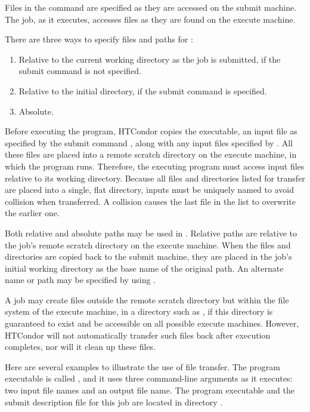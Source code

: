 Files in the  command
are specified as they are accessed on the submit machine.
The job, as it executes, accesses files as they are
found on the execute machine.

There are three ways to specify files and paths
for :
\begin{enumerate}
\item Relative to the current working directory as the job is submitted,
if the submit command  is not specified.
\item Relative to the initial directory, if the submit command 
 is specified.
\item Absolute.
\end{enumerate}

Before executing the program, HTCondor copies the
executable, an input file as specified
by the submit command ,
along with any input files specified 
by .
All these files are placed into
a remote scratch directory on the execute machine,
in which the program runs.
Therefore,
the executing program must access input files relative to its
working directory.
Because all files and directories listed for transfer are placed into a single,
flat directory,
inputs must be uniquely named to
avoid collision when transferred.
A collision causes the last file in the list to
overwrite the earlier one.

Both relative and absolute paths may be used in
.  Relative paths are relative to
the job's remote scratch directory on the execute machine.
When the files and directories are copied back to the submit machine, they
are placed in the job's initial working directory as the base name of
the original path.  An alternate name or path may be specified by using
.

A job may create files outside the remote scratch directory
but within the file system of the execute machine,
in a directory such as ,
if this directory is guaranteed to exist and be
accessible on all possible execute machines.
However,
HTCondor will not automatically
transfer such files back after execution completes, nor will it clean
up these files.

Here are several examples to illustrate the use of file transfer.
The program executable is called ,
and it uses three command-line arguments as it executes: 
two input file names and an output file name.
The program executable and the submit description file 
for this job are located in directory
. 

